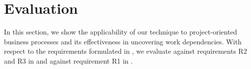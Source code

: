 \section{Evaluation}
\label{sec:bpm2017evaluation}

In this section, we show the applicability of our technique to project-oriented business processes and its effectiveness in uncovering work dependencies. With respect to the requirements formulated in , we evaluate against requirements {R2} and {R3} in  and against requirement {R1} in .



%



%

